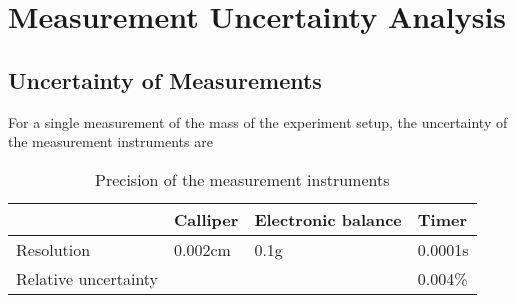 \section{Measurement Uncertainty Analysis}


\subsection{Uncertainty of Measurements}
For a single measurement of the mass of the experiment setup, the uncertainty of the measurement instruments are

\begin{table}[H]
  \centering
  \begin{tabularx}{\textwidth}{|X|X|X|X|}
    \hline
     & Calliper & Electronic balance & Timer\\
	 \hline
	 Resolution & 0.002cm & 0.1g & 0.0001s \\
	 \hline
	 Relative uncertainty & & & 0.004\% \\
	\hline
  \end{tabularx}
  \caption{Precision of the measurement instruments}
  \end{table}


